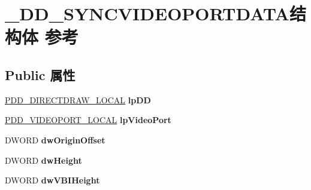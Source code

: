 \hypertarget{struct___d_d___s_y_n_c_v_i_d_e_o_p_o_r_t_d_a_t_a}{}\section{\+\_\+\+D\+D\+\_\+\+S\+Y\+N\+C\+V\+I\+D\+E\+O\+P\+O\+R\+T\+D\+A\+T\+A结构体 参考}
\label{struct___d_d___s_y_n_c_v_i_d_e_o_p_o_r_t_d_a_t_a}
\subsection*{Public 属性}
\begin{DoxyCompactItemize}
\item 
\mbox{\label{struct___d_d___s_y_n_c_v_i_d_e_o_p_o_r_t_d_a_t_a_ad0af15720e80d1ebba6cb4313412bfb3}} 
\hyperlink{struct___d_d___d_i_r_e_c_t_d_r_a_w___l_o_c_a_l}{P\+D\+D\+\_\+\+D\+I\+R\+E\+C\+T\+D\+R\+A\+W\+\_\+\+L\+O\+C\+AL} {\bfseries lp\+DD}
\item 
\mbox{\label{struct___d_d___s_y_n_c_v_i_d_e_o_p_o_r_t_d_a_t_a_a16c4605047f3743832b8d6e558a9a106}} 
\hyperlink{struct___d_d___v_i_d_e_o_p_o_r_t___l_o_c_a_l}{P\+D\+D\+\_\+\+V\+I\+D\+E\+O\+P\+O\+R\+T\+\_\+\+L\+O\+C\+AL} {\bfseries lp\+Video\+Port}
\item 
\mbox{\label{struct___d_d___s_y_n_c_v_i_d_e_o_p_o_r_t_d_a_t_a_a7dc4b648c45e0b7b51a1e5440a7cdadd}} 
D\+W\+O\+RD {\bfseries dw\+Origin\+Offset}
\item 
\mbox{\label{struct___d_d___s_y_n_c_v_i_d_e_o_p_o_r_t_d_a_t_a_a94f9da947dfdc3a89d98e90d54d2a080}} 
D\+W\+O\+RD {\bfseries dw\+Height}
\item 
\mbox{\label{struct___d_d___s_y_n_c_v_i_d_e_o_p_o_r_t_d_a_t_a_a824bc7d993f98dba563f2f6fd1d28416}} 
D\+W\+O\+RD {\bfseries dw\+V\+B\+I\+Height}
\item 
\mbox{\label{struct___d_d___s_y_n_c_v_i_d_e_o_p_o_r_t_d_a_t_a_a7b559fd591ca97ae6a76703423a629a7}} 

\end{DoxyCompactItemize}
